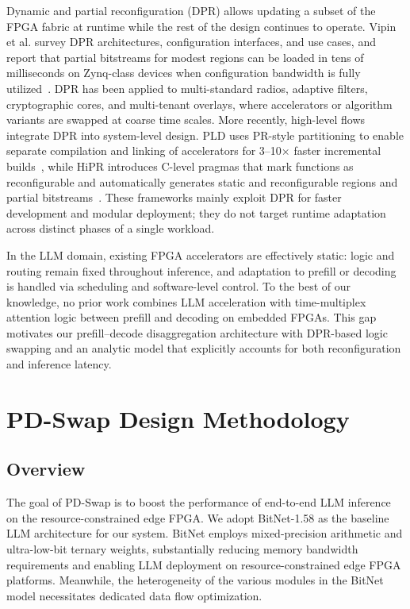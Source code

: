 \documentclass[9pt,sigconf]{acmart}
\begin{document}
Dynamic and partial reconfiguration (DPR) allows updating a subset of the FPGA fabric at runtime while the rest of the design continues to operate. Vipin et al. survey DPR architectures, configuration interfaces, and use cases, and report that partial bitstreams for modest regions can be loaded in tens of milliseconds on Zynq-class devices when configuration bandwidth is fully utilized~\cite{vipin2018survey}. DPR has been applied to multi-standard radios, adaptive filters, cryptographic cores, and multi-tenant overlays, where accelerators or algorithm variants are swapped at coarse time scales. More recently, high-level flows ~\cite{xiao2022hipr,xiao2022pld, pr_esp} integrate DPR into system-level design.
PLD uses PR-style partitioning to enable separate compilation and linking of accelerators for 3--10$\times$ faster incremental builds~\cite{xiao2022pld}, while HiPR introduces C-level pragmas that mark functions as reconfigurable and automatically generates static and reconfigurable regions and partial bitstreams~\cite{xiao2022hipr}. These frameworks mainly exploit DPR for faster development and modular deployment; they do not target runtime adaptation across distinct phases of a single workload.

In the LLM domain, existing FPGA accelerators are effectively static: logic and routing remain fixed throughout inference, and adaptation to prefill or decoding is handled via scheduling and software-level control. To the best of our knowledge, no prior work combines LLM acceleration with time-multiplex attention logic between prefill and decoding on embedded FPGAs. This gap motivates our prefill--decode disaggregation architecture with DPR-based logic swapping and an analytic model that explicitly accounts for both reconfiguration and inference latency.








\section{PD-Swap Design Methodology}
\subsection{Overview}
The goal of PD-Swap is to boost the performance of end-to-end LLM inference on the resource-constrained edge FPGA. 
We adopt BitNet-1.58 as the baseline LLM architecture for our system. BitNet employs mixed-precision arithmetic and ultra-low-bit ternary weights, substantially reducing memory bandwidth requirements and enabling LLM deployment on resource-constrained edge FPGA platforms.
Meanwhile, the heterogeneity of the various modules in the BitNet model necessitates dedicated data flow optimization. 
\end{document}
